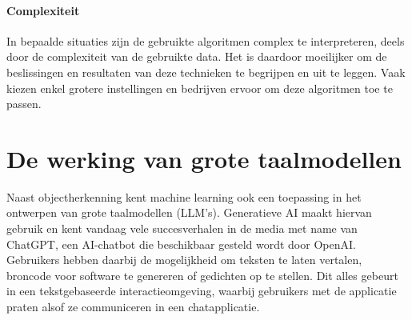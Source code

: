 \paragraph{Complexiteit}
In bepaalde situaties zijn de gebruikte algoritmen complex te interpreteren, deels door de complexiteit van de gebruikte data.
Het is daardoor moeilijker om de beslissingen en resultaten van deze technieken te begrijpen en uit te leggen.
Vaak kiezen enkel grotere instellingen en bedrijven ervoor om deze algoritmen toe te passen.


\section{De werking van grote taalmodellen}
\label{sec:ls-artificiele-intelligentie}
Naast objectherkenning kent machine learning ook een toepassing in het ontwerpen van grote taalmodellen (LLM's).
Generatieve AI maakt hiervan gebruik en kent vandaag vele succesverhalen in de media met name van ChatGPT, een AI-chatbot die beschikbaar gesteld wordt door OpenAI\@.
Gebruikers hebben daarbij de mogelijkheid om teksten te laten vertalen, broncode voor software te genereren of gedichten op te stellen.
Dit alles gebeurt in een tekstgebaseerde interactieomgeving, waarbij gebruikers met de applicatie praten alsof ze communiceren in een chatapplicatie.
